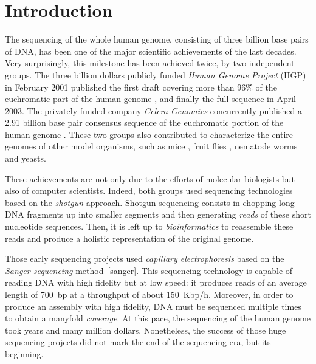 \chapter{Introduction}

The sequencing of the whole human genome, consisting of three billion base pairs of DNA, has been one of the major scientific achievements of the last decades.
Very surprisingly, this milestone has been achieved twice, by two independent groups.
The three billion dollars publicly funded \emph{Human Genome Project} (HGP) in February 2001 published the first draft covering more than 96\~\% of the euchromatic part of the human genome \citep{hgp}, and finally the full sequence in April 2003.
The privately funded company \emph{Celera Genomics} concurrently published a 2.91 billion base pair consensus sequence of the euchromatic portion of the human genome \citep{celerahuman}.
These two groups also contributed to characterize the entire genomes of other model organisms, such as mice \citep{mouse}, fruit flies \citep{celerafly}, nematode worms and yeasts.

These achievements are not only due to the efforts of molecular biologists but also of computer scientists.
Indeed, both groups used sequencing technologies based on the \emph{shotgun} approach.
Shotgun sequencing consists in chopping long DNA fragments up into smaller segments and then generating \emph{reads} of these short nucleotide sequences.
Then, it is left up to \emph{bioinformatics} to reassemble these reads and produce a holistic representation of the original genome.


Those early sequencing projects used \emph{capillary electrophoresis} based on the \emph{Sanger sequencing} method~\ref{sanger}.
This sequencing technology is capable of reading DNA with high fidelity but at low speed: it produces reads of an average length of 700~bp at a throughput of about 150~Kbp/h.
Moreover, in order to produce an assembly with high fidelity, DNA must be sequenced multiple times to obtain a manyfold \emph{coverage}.
At this pace, the sequencing of the human genome took years and many million dollars.
Nonetheless, the success of those huge sequencing projects did not mark the end of the sequencing era, but its beginning.

